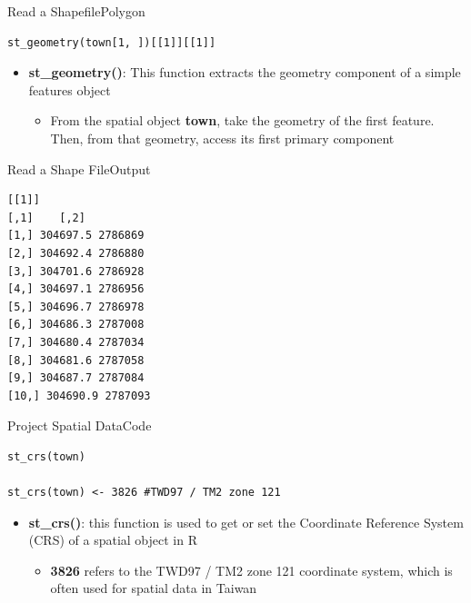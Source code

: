 \documentclass[hyperref={pdfpagelabels=false}]{beamer}
\begin{document}
\begin{frame}[fragile]{Read a Shapefile}{Polygon}

\begin{lstlisting}
st_geometry(town[1, ])[[1]][[1]]
\end{lstlisting}
\begin{itemize}

\item \textbf{st\_geometry()}: This function extracts the geometry component of a simple features object
	\vspace{0.2cm}
\begin{itemize}
\item From the spatial object \textbf{town}, take the geometry of the first feature. Then, from that geometry, access its first primary component
\end{itemize}

\end{itemize}
\end{frame}


\begin{frame}[fragile]{Read a Shape File}{Output}


\begin{lstlisting}
[[1]]
[,1]    [,2]
[1,] 304697.5 2786869
[2,] 304692.4 2786880
[3,] 304701.6 2786928
[4,] 304697.1 2786956
[5,] 304696.7 2786978
[6,] 304686.3 2787008
[7,] 304680.4 2787034
[8,] 304681.6 2787058
[9,] 304687.7 2787084
[10,] 304690.9 2787093
\end{lstlisting}

\end{frame}


\begin{frame}[fragile]{Project Spatial Data}{Code}
	
\begin{lstlisting}
st_crs(town)

st_crs(town) <- 3826 #TWD97 / TM2 zone 121
\end{lstlisting}
	\begin{itemize}
		\item \textbf{st\_crs()}: this function is used to get or set the Coordinate Reference System (CRS) of a spatial object in R
		\vspace{0.2cm}
		\begin{itemize}
			\item \textbf{3826} refers to the TWD97 / TM2 zone 121 coordinate system, which is often used for spatial data in Taiwan
			
		\end{itemize}
	\end{itemize}
	
	
	
	
\end{frame}
\end{document}

